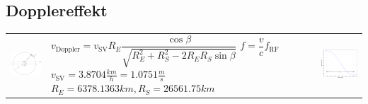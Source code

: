 \subsection{Dopplereffekt }
\begin{tabular}{lll}
\parbox{5cm}{
    \includegraphics[width=5cm]{./bilder/gps-doppler-constellation.png}}
& \parbox{7cm}{
    $v_{\text{Doppler}} = v_{\text{SV}} R_E\dfrac{\cos \beta}{\sqrt{R_E^2+R_S^2
    -2R_ER_S \sin \beta }}$\\
    $f = \dfrac{v}{c} f_{\text{RF}}$ \\ \\
    $v_{\text{SV}} = 3.8704\frac{km}{h} = 1.0751\frac{m}{s}$ \\
    $R_E = 6378.1363km, R_S = 26561.75km$}
& \parbox{6cm}{
    \includegraphics[width=6cm]{./bilder/gps-doppler-speed.png}}
\end{tabular}

